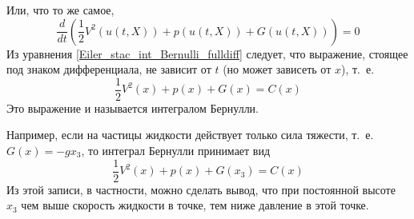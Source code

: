 Или, что то же самое,
\begin{equation*} \label{Eiler_stac_int_Bernulli_fulldiff}
	\frac{d}{dt}\left(\frac{1}{2} V^2(u(t,X)) + p(u(t,X)) + G (u(t,X))\right) = 0
\end{equation*}
Из уравнения \eqref{Eiler_stac_int_Bernulli_fulldiff} следует, что выражение,
стоящее под знаком дифференциала, не зависит от $t$ (но может зависеть от $x$), т.~е.
\begin{equation*} \label{int_Bernulli}
	\frac{1}{2} V^2(x) + p(x) + G (x) = C(x)
\end{equation*}
Это выражение и называется интегралом Бернулли.

Например, если на частицы жидкости действует только сила тяжести,
т.~е. $G(x) = -gx_3$, то интеграл Бернулли принимает вид
\begin{equation*} \label{int_Bernulli}
	\frac{1}{2} V^2(x) + p(x) + G (x_3) = C(x)
\end{equation*}
Из этой записи, в частности, можно сделать вывод,
что при постоянной высоте $x_3$ чем выше скорость жидкости в точке,
тем ниже давление в этой точке.
